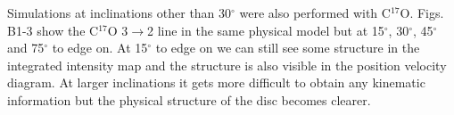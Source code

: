 \documentclass[useAMS,usenatbib]{mn2e}
\begin{document}
Simulations at inclinations other than 30$^\circ$ were also performed with C$^{17}$O. Figs. B1-3 show the C$^{17}$O 3$\rightarrow$2 line in the same physical model but at 15$^\circ$, 30$^\circ$, 45$^\circ$ and 75$^\circ$ to edge on. At 15$^\circ$ to edge on we can still see some structure in the integrated intensity map and the structure is also visible in the position velocity diagram. At larger inclinations it gets more difficult to obtain any kinematic information but the physical structure of the disc becomes clearer.

\bsp
\label{lastpage}
\end{document}
